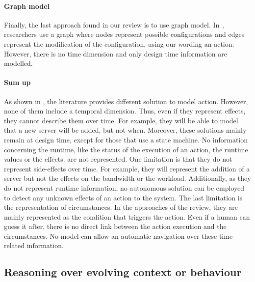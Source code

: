	
\paragraph{Graph model}
Finally, the last approach found in our review is to use graph model.
In~\cite{DBLP:journals/computer/GeorgasHT09}, researchers use a graph where nodes represent possible configurations and edges represent the modification of the configuration, using our wording an \gls{action}.
However, there is no time dimension and only design time information are modelled.

\paragraph{Sum up}
As shown in , the literature provides different solution to model \gls{action}.
However, none of them include a temporal dimension.
Thus, even if they represent effects, they cannot describe them over time.
For example, they will be able to model that a new server will be added, but not when.
Moreover, these solutions mainly remain at design time, except for those that use a state machine.
No information concerning the runtime, like the status of the execution of an action, the runtime values or the effects. are not represented.
One limitation is that they do not represent side-effects over time.
For example, they will represent the addition of a server but not the effects on the bandwidth or the workload.
Additionally, as they do not represent runtime information, no autonomous solution can be employed to detect any unknown effects of an action to the system.
The last limitation is the representation of \glspl{circumstance}.
In the approaches of the review, they are mainly represented as the condition that triggers the action.
Even if a human can guess it after, there is no direct link between the action execution and the circumstances.
No model can allow an automatic navigation over these time-related information. 

\vfill
	 
\subsection[Reasoning over evolving context or behaviour]{Reasoning over evolving context or \gls{behaviour}}

